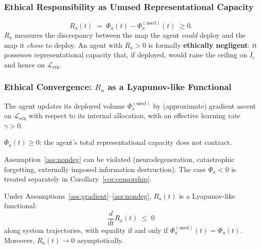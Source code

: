 \subsubsection{Ethical Responsibility as Unused Representational Capacity}
\label{sec:responsibility}

\begin{definition}
\begin{equation}
\label{eq:Ra}
    R_a(t)
    \;=\;
    \Phi_a(t)-\Phi_a^{(\mathrm{used})}(t)
    \;\geq 0.
\end{equation}
$R_a$ measures the discrepancy between the map the agent \emph{could}
deploy and the map it \emph{chose} to deploy.  An agent with $R_a>0$
is formally \textbf{ethically negligent}: it possesses representational
capacity that, if deployed, would raise the ceiling on $\dot{I}_c$
and hence on $\mathcal{L}_{\mathrm{eth}}$.
\end{definition}


\subsubsection{Ethical Convergence: $R_a$ as a Lyapunov-like Functional}
\label{sec:lyapunov}

\begin{assumption}
\label{ass:gradient}
The agent updates its deployed volume $\Phi_a^{(\mathrm{used})}$ by
(approximate) gradient ascent on $\mathcal{L}_{\mathrm{eth}}$ with
respect to its internal allocation, with an effective learning rate
$\gamma>0$.
\end{assumption}

\begin{assumption}
\label{ass:nondeg}
$\dot{\Phi}_a(t)\geq 0$: the agent's total representational capacity
does not contract.
\end{assumption}

\begin{remark}
Assumption~\ref{ass:nondeg} can be violated (neurodegeneration,
catastrophic forgetting, externally imposed information destruction).
The case $\dot{\Phi}_a<0$ is treated separately in
Corollary~\ref{cor:censorship}.
\end{remark}

\begin{theorem}
\label{thm:lyapunov}
Under Assumptions~\ref{ass:gradient}--\ref{ass:nondeg}, $R_a(t)$ is
a Lyapunov-like functional:
\begin{equation}
\label{eq:lyapunov}
    \frac{d}{dt}R_a(t)\;\leq\; 0
\end{equation}
along system trajectories, with equality if and only if
$\Phi_a^{(\mathrm{used})}(t)=\Phi_a(t)$.
Moreover, $R_a(t)\to 0$ asymptotically.
\end{theorem}


